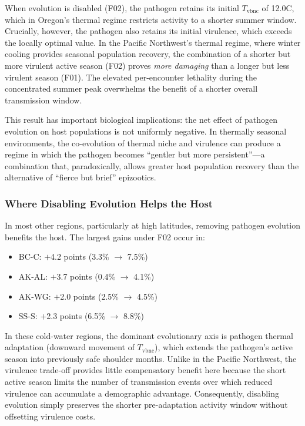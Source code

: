 When evolution is disabled (F02), the pathogen retains its initial
$T_\mathrm{vbnc}$ of 12.0\textdegree C, which in Oregon's thermal
regime restricts activity to a shorter summer window.  Crucially,
however, the pathogen also retains its initial virulence, which exceeds
the locally optimal value.  In the Pacific Northwest's thermal regime,
where winter cooling provides seasonal population recovery, the
combination of a shorter but more virulent active season (F02) proves
\textit{more damaging} than a longer but less virulent season (F01).
The elevated per-encounter lethality during the concentrated summer
peak overwhelms the benefit of a shorter overall transmission window.

This result has important biological implications: the net effect of
pathogen evolution on host populations is not uniformly negative.  In
thermally seasonal environments, the co-evolution of thermal niche and
virulence can produce a regime in which the pathogen becomes ``gentler
but more persistent''---a combination that, paradoxically, allows
greater host population recovery than the alternative of ``fierce but
brief'' epizootics.

\subsubsection{Where Disabling Evolution Helps the Host}

In most other regions, particularly at high latitudes, removing
pathogen evolution benefits the host.  The largest gains under F02
occur in:

\begin{itemize}
  \item BC-C: $+$4.2 points (3.3\% $\rightarrow$ 7.5\%)
  \item AK-AL: $+$3.7 points (0.4\% $\rightarrow$ 4.1\%)
  \item AK-WG: $+$2.0 points (2.5\% $\rightarrow$ 4.5\%)
  \item SS-S: $+$2.3 points (6.5\% $\rightarrow$ 8.8\%)
\end{itemize}

\noindent
In these cold-water regions, the dominant evolutionary axis is pathogen
thermal adaptation (downward movement of $T_\mathrm{vbnc}$), which
extends the pathogen's active season into previously safe shoulder
months.  Unlike in the Pacific Northwest, the virulence trade-off
provides little compensatory benefit here because the short active
season limits the number of transmission events over which reduced
virulence can accumulate a demographic advantage.  Consequently,
disabling evolution simply preserves the shorter pre-adaptation
activity window without offsetting virulence costs.

